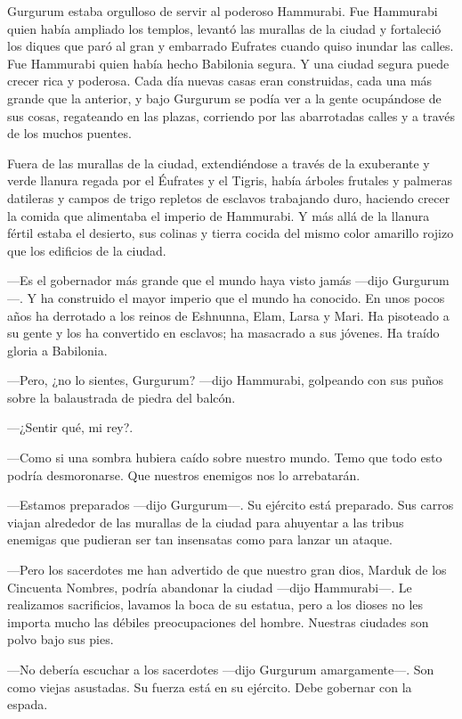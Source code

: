 Gurgurum estaba orgulloso de servir al poderoso Hammurabi. Fue Hammurabi
quien había ampliado los templos, levantó las murallas de la ciudad y
fortaleció los diques que paró al gran y embarrado Eufrates cuando quiso
inundar las calles. Fue Hammurabi quien había hecho Babilonia segura. Y
una ciudad segura puede crecer rica y poderosa. Cada día nuevas casas
eran construidas, cada una más grande que la anterior, y bajo Gurgurum
se podía ver a la gente ocupándose de sus cosas, regateando en las
plazas, corriendo por las abarrotadas calles y a través de los muchos
puentes.

Fuera de las murallas de la ciudad, extendiéndose a través de la
exuberante y verde llanura regada por el Éufrates y el Tigris, había
árboles frutales y palmeras datileras y campos de trigo repletos de
esclavos trabajando duro, haciendo crecer la comida que alimentaba el
imperio de Hammurabi. Y más allá de la llanura fértil estaba el
desierto, sus colinas y tierra cocida del mismo color amarillo rojizo
que los edificios de la ciudad.

---Es el gobernador más grande que el mundo haya visto jamás ---dijo
Gurgurum---. Y ha construido el mayor imperio que el mundo ha conocido.
En unos pocos años ha derrotado a los reinos de Eshnunna, Elam, Larsa y
Mari. Ha pisoteado a su gente y los ha convertido en esclavos; ha
masacrado a sus jóvenes. Ha traído gloria a Babilonia.

---Pero, ¿no lo sientes, Gurgurum? ---dijo Hammurabi, golpeando con sus
puños sobre la balaustrada de piedra del balcón.

---¿Sentir qué, mi rey?.

---Como si una sombra hubiera caído sobre nuestro mundo. Temo que todo
esto podría desmoronarse. Que nuestros enemigos nos lo arrebatarán.

---Estamos preparados ---dijo Gurgurum---. Su ejército está preparado.
Sus carros viajan alrededor de las murallas de la ciudad para ahuyentar
a las tribus enemigas que pudieran ser tan insensatas como para lanzar
un ataque.

---Pero los sacerdotes me han advertido de que nuestro gran dios, Marduk
de los Cincuenta Nombres, podría abandonar la ciudad ---dijo
Hammurabi---. Le realizamos sacrificios, lavamos la boca de su estatua,
pero a los dioses no les importa mucho las débiles preocupaciones del
hombre. Nuestras ciudades son polvo bajo sus pies.

---No debería escuchar a los sacerdotes ---dijo Gurgurum amargamente---.
Son como viejas asustadas. Su fuerza está en su ejército. Debe gobernar
con la espada.

